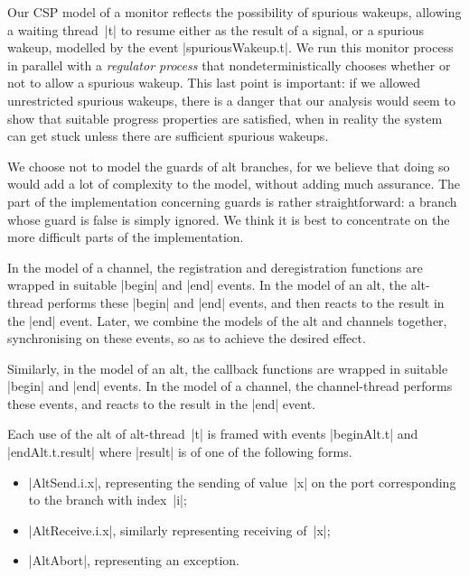 Our CSP model of a monitor reflects the possibility of spurious wakeups,
allowing a waiting thread~|t| to resume either as the result of a signal, or a
spurious wakeup, modelled by the event |spuriousWakeup.t|.  We run this
monitor process in parallel with a \emph{regulator process} that
nondeterministically chooses whether or not to allow a spurious wakeup.  This
last point is important: if we allowed unrestricted spurious wakeups, there is
a danger that our analysis would seem to show that suitable progress
properties are satisfied, when in reality the system can get stuck unless
there are sufficient spurious wakeups.

We choose not to model the guards of alt branches, for we believe that doing
so would add a lot of complexity to the model, without adding much assurance.
The part of the implementation concerning guards is rather straightforward: a
branch whose guard is false is simply ignored.  We think it is best to
concentrate on the more difficult parts of the implementation.

In the model of a channel, the registration and deregistration functions are
wrapped in suitable |begin| and |end| events.  In the model of an alt, the
alt-thread performs these |begin| and |end| events, and then reacts to the
result in the |end| event.  Later, we combine the models of the alt and
channels together, synchronising on these events, so as to achieve the desired
effect.

Similarly, in the model of an alt, the callback functions are wrapped in
suitable |begin| and |end| events.  In the model of a channel, the
channel-thread performs these events, and reacts to the result in the |end|
event.  

Each use of the alt of alt-thread~|t| is framed with events |beginAlt.t| and
|endAlt.t.result| where |result| is of one of the following forms.
%
\begin{itemize}
\item |AltSend.i.x|, representing the sending of value~|x| on the port
  corresponding to the branch with index~|i|;

\item |AltReceive.i.x|, similarly representing receiving of~|x|;

\item |AltAbort|, representing an  exception.
\end{itemize}
